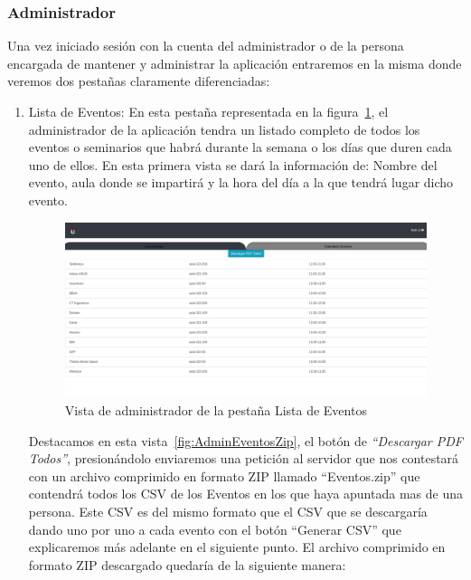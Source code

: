 \documentclass[a4paper, 12pt]{book}
\begin{document}
\subsubsection{Administrador}
	Una vez iniciado sesión con la cuenta del administrador o de la persona encargada de mantener y administrar la aplicación entraremos en la misma donde veremos dos pestañas claramente diferenciadas:
\begin{enumerate}	
	\item Lista de Eventos: En esta pestaña representada en la figura~\ref{fig:adminListaEventos}, el administrador de la aplicación tendra un listado completo de todos los eventos o seminarios que habrá durante la semana o los días que duren cada uno de ellos. En esta primera vista se dará la información de: Nombre del evento, aula donde se impartirá y la hora del día a la que tendrá lugar dicho evento.
	\begin{figure}
  	\centering
  	\includegraphics[width=16cm, keepaspectratio]{img/adminListaEventos.png}
  	\caption{Vista de administrador de la pestaña Lista de Eventos}\label{fig:adminListaEventos}
	\end{figure}

Destacamos en esta vista~\ref{fig:AdminEventosZip}, el botón de \textit{``Descargar PDF Todos''}, presionándolo enviaremos una petición al servidor que nos contestará con un archivo comprimido en formato ZIP llamado ``Eventos.zip'' que contendrá todos los CSV de los Eventos en los que haya apuntada mas de una persona. Este CSV es del mismo formato que el CSV que se descargaría dando uno por uno a cada evento con el botón ``Generar CSV'' que explicaremos más adelante en el siguiente punto. El archivo comprimido en formato ZIP descargado quedaría de la siguiente manera:
	

\end{enumerate}
\end{document}
